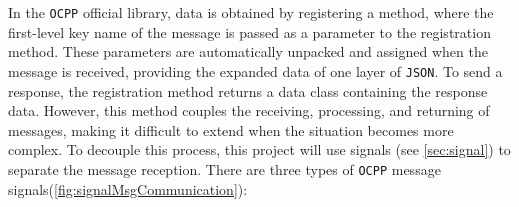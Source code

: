 \documentclass[
english,
ruledheaders=section,%
class=report,%
thesis={type=Report},%
accentcolor=9c,%
custommargins=true,%
marginpar=false,%
parskip=half-,%
fontsize=11pt,%
logofile={img/tuda_logo.pdf}, %
]{tudapub}
\begin{document}
    In the \texttt{OCPP} official library, data is obtained by registering a method, where the first-level key name of the message is passed as a parameter to the registration method. These parameters are automatically unpacked and assigned when the message is received, providing the expanded data of one layer of \texttt{JSON}. To send a response, the registration method returns a data class containing the response data.
    However, this method couples the receiving, processing, and returning of messages, making it difficult to extend when the situation becomes more complex. To decouple this process, this project will use signals (see \ref{sec:signal}) to separate the message reception. There are three types of \texttt{OCPP} message signals(\autoref{fig:signalMsgCommunication}):

    \begin{itemize}


\end{itemize}
\end{document}
